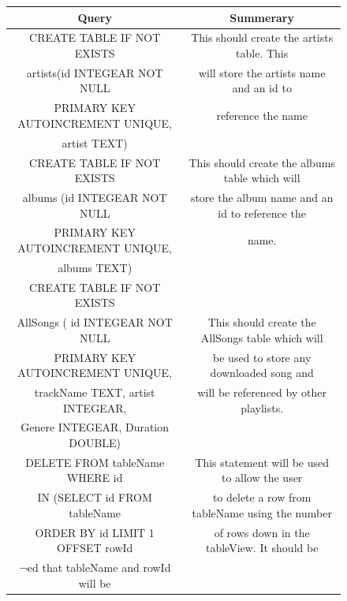 \documentclass{article}
\begin{document}
\begin{figure}[H]
    \begin{center}
        \begin{tabular} { | c | c | }
            \hline
            \textbf{Query}                   &                 \textbf{Summerary}             \\ \hline
            CREATE TABLE IF NOT EXISTS       &This should create the artists table. This      \\
            artists(id INTEGEAR NOT NULL     &will store the artists name and an id to        \\
            PRIMARY KEY AUTOINCREMENT UNIQUE,&reference the name                              \\
            artist TEXT)                     &                                                \\ \hline
            CREATE TABLE IF NOT EXISTS       &This should create the albums table which will  \\
            albums (id INTEGEAR NOT NULL     &store the album name and an id to reference the \\
            PRIMARY KEY AUTOINCREMENT UNIQUE,&name.                                           \\
            albums TEXT)                     &                                                \\ \hline
            CREATE TABLE IF NOT EXISTS       &                                                \\
            AllSongs ( id INTEGEAR NOT NULL  &This should create the AllSongs table which will\\
            PRIMARY KEY AUTOINCREMENT UNIQUE,&be used to store any downloaded song and        \\
            trackName TEXT, artist INTEGEAR, &will be referenced by other playlists.          \\
            Genere INTEGEAR, Duration DOUBLE)&                                                \\ \hline
            DELETE FROM tableName WHERE id   &This statement will be used to allow the user   \\
            IN (SELECT id FROM tableName     &to delete a row from tableName using the number \\
            ORDER BY id LIMIT 1 OFFSET rowId &of rows down in the tableView. It should be     \\
                                             ¬ed that tableName and rowId will be          \\

\end{tabular}
\end{center}
\end{figure}
\end{document}
